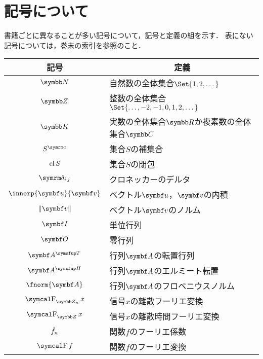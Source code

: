 \documentclass[../../main]{subfiles}
\begin{document}
\chapter{記号について}
\thispagestyle{empty}
書籍ごとに異なることが多い記号について，記号と定義の組を示す．
表にない記号については，巻末の索引を参照のこと．

\vspace*{\fill}
\begin{table*}
  \centering
  \begin{tabular}{c|l} \hline
    記号 & \multicolumn{1}{c}{定義} \\ \hline
    \(\numset{N}\) & 自然数の全体集合\(\Set{1,2,\dotsc}\) \\
    \(\numset{Z}\) & 整数の全体集合\(\Set{\dotsc,-2,-1,0,1,2,\dotsc}\) \\
    \(\numset{K}\) & 実数の全体集合\(\numset{R}\)か複素数の全体集合\(\numset{C}\) \\
    \(\scomp{S}\) & 集合\(S\)の補集合 \\
    \(\operatorname{cl} S\) & 集合\(S\)の閉包 \\
    \(\kdelta{i}{j}\) & クロネッカーのデルタ \\
    \(\innerp{\vect{u}}{\vect{v}}\) & ベクトル\(\vect{u}\)，\(\vect{v}\)の内積 \\
    \(\vnorm{\vect{v}}\) & ベクトル\(\vect{v}\)のノルム \\
    \(\imat\) & 単位行列 \\
    \(\zmat\) & 零行列 \\
    \(\trps{\mat{A}}\) & 行列\(\mat{A}\)の転置行列 \\
    \(\htrps{\mat{A}}\) & 行列\(\mat{A}\)のエルミート転置 \\
    \(\fnorm{\mat{A}}\) & 行列\(\mat{A}\)のフロベニウスノルム \\
    \(\dft{n}x\) & 信号\(x\)の離散フーリエ変換 \\
    \(\dtft x\) & 信号\(x\)の離散時間フーリエ変換 \\
    \(\hat{f}_n\) & 関数\(f\)のフーリエ係数 \\
    \(\ftrans f\) & 関数\(f\)のフーリエ変換 \\ \hline
  \end{tabular}
\end{table*}
\vspace*{\fill}
\end{document}
